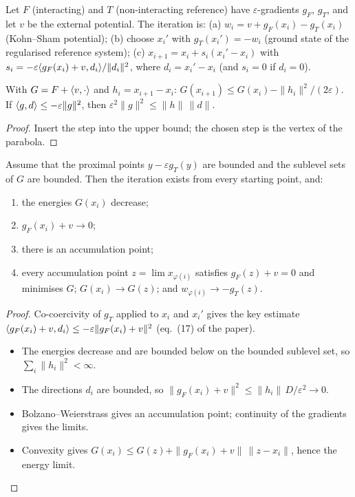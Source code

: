 \begin{definition}[MYKSODA]
  \label{def:myksoda}
  \leanok
  Let $F$ (interacting) and $T$ (non-interacting reference) have $\varepsilon$-gradients $g_F$, $g_T$, and let
  $v$ be the external potential. The iteration is:
  (a) $w_i = v+g_F(x_i)-g_T(x_i)$ (Kohn--Sham potential);
  (b) choose $x_i'$ with $g_T(x_i')=-w_i$ (ground state of the regularised reference system);
  (c) $x_{i+1}=x_i+s_i(x_i'-x_i)$ with $s_i=-\varepsilon\langle g_F(x_i)+v, d_i\rangle/\|d_i\|^2$, where
  $d_i = x_i'-x_i$ (and $s_i=0$ if $d_i=0$).
\end{definition}

\begin{lemma}
  \label{lem:step_descent}
  \leanok
  With $G=F+\langle v, \cdot\rangle$ and $h_i=x_{i+1}-x_i$: $G(x_{i+1})\le G(x_i)-\|h_i\|^2/(2\varepsilon)$. If
  $\langle g, d\rangle\le-\varepsilon\|g\|^2$, then $\varepsilon^2\|g\|^2\le\|h\|\,\|d\|$.
\end{lemma}
\begin{proof}
  \leanok
  Insert the step into the upper bound; the chosen step is the vertex of the parabola.
\end{proof}

\begin{theorem}
  \label{thm:myksoda_converges}
  \leanok
  Assume that the proximal points $y-\varepsilon g_T(y)$ are bounded and the sublevel sets of $G$ are
  bounded. Then the iteration exists from every starting point, and:
  \begin{enumerate}
    \item the energies $G(x_i)$ decrease;
    \item $g_F(x_i)+v\to0$;
    \item there is an accumulation point;
    \item every accumulation point $z=\lim x_{\varphi(i)}$ satisfies $g_F(z)+v=0$ and minimises $G$;
      $G(x_i)\to G(z)$; and $w_{\varphi(i)}\to-g_T(z)$.
  \end{enumerate}
\end{theorem}
\begin{proof}
  \leanok
  Co-coercivity of $g_T$ applied to $x_i$ and $x_i'$ gives the key estimate
  $\langle g_F(x_i)+v, d_i\rangle\le-\varepsilon\|g_F(x_i)+v\|^2$ (eq.~(17) of the paper).
  \begin{itemize}
    \item The energies decrease and are bounded below on the bounded sublevel set, so
      $\sum_i\|h_i\|^2<\infty$.
    \item The directions $d_i$ are bounded, so $\|g_F(x_i)+v\|^2\le\|h_i\|\,D/\varepsilon^2\to0$.
    \item Bolzano--Weierstrass gives an accumulation point; continuity of the gradients gives the limits.
    \item Convexity gives $G(x_i)\le G(z)+\|g_F(x_i)+v\|\,\|z-x_i\|$, hence the energy limit.
  \end{itemize}
\end{proof}

